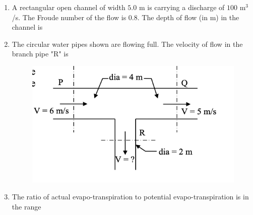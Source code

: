\documentclass[journal]{IEEEtran}
\begin{document}
\begin{enumerate}
\item A rectangular open channel of width $5.0$ m is carrying a discharge of $100$ m$^3$/s. The Froude number of the flow is $0.8$. The depth of flow (in m) in the channel is \hfill {}
\begin{enumerate}
\end{enumerate}

\item The circular water pipes shown are flowing full. The velocity of flow  in the branch pipe "R" is \hfill {}

\begin{figure}[H]
    \centering
    \includegraphics[width=0.3\columnwidth]{figs/Q18.png} 
    \caption{}
    \label{fig:placeholder}
\end{figure}
\begin{enumerate}
\end{enumerate}

\item The ratio of actual evapo-transpiration to potential evapo-transpiration is in the range \hfill {}
\begin{enumerate}
\end{enumerate}


\end{enumerate}
\end{document}

